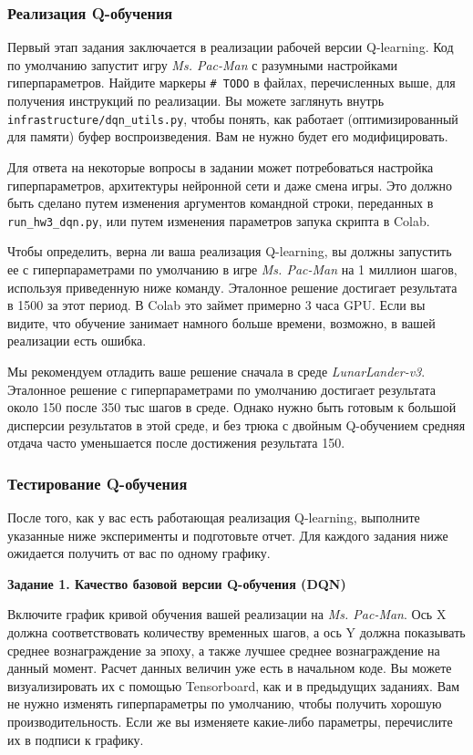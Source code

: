 \documentclass[12pt, oneside]{article}
\begin{document}
\subsubsection{Реализация Q-обучения}

Первый этап задания заключается в реализации рабочей версии Q-learning. Код по умолчанию запустит игру \textit{Ms. Pac-Man} с разумными настройками гиперпараметров. Найдите маркеры \verb|# TODO| в файлах, перечисленных выше, для получения инструкций по реализации. Вы можете заглянуть внутрь \verb|infrastructure/dqn_utils.py|, чтобы понять, как работает (оптимизированный для памяти) буфер воспроизведения. Вам не нужно будет его модифицировать.

Для ответа на некоторые вопросы в задании может потребоваться настройка гиперпараметров, архитектуры нейронной сети и даже смена игры. Это должно быть сделано путем изменения аргументов командной строки, переданных в \verb|run_hw3_dqn.py|, или путем изменения параметров запука скрипта в Colab.

Чтобы определить, верна ли ваша реализация Q-learning, вы должны запустить ее с гиперпараметрами по умолчанию в игре \textit{Ms. Pac-Man} на 1 миллион шагов, используя приведенную ниже команду. Эталонное решение достигает результата в 1500 за этот период. В Colab это займет примерно 3 часа GPU. Если вы видите, что обучение занимает намного больше времени, возможно, в вашей реализации есть ошибка.

Мы рекомендуем отладить ваше решение сначала в среде \textit{LunarLander-v3}. Эталонное решение с гиперпараметрами по умолчанию достигает результата около 150 после 350 тыс шагов в среде. Однако нужно быть готовым к большой дисперсии результатов в этой среде, и без трюка с двойным Q-обучением средняя отдача часто уменьшается после достижения результата 150.

\subsubsection{Тестирование Q-обучения}

После того, как у вас есть работающая реализация Q-learning, выполните указанные ниже эксперименты и подготовьте отчет. Для каждого задания ниже ожидается получить от вас по одному графику.

\textbf{Задание 1. Качество базовой версии Q-обучения (DQN)}

Включите график кривой обучения вашей реализации на \textit{Ms. Pac-Man}. Ось X должна соответствовать количеству временных шагов, а ось Y должна показывать среднее вознаграждение за эпоху, а также лучшее среднее вознаграждение на данный момент. Расчет данных величин уже есть в начальном коде. Вы можете визуализировать их с помощью Tensorboard, как и в предыдущих заданиях. Вам не нужно изменять гиперпараметры по умолчанию, чтобы получить хорошую производительность. Если же вы изменяете какие-либо параметры, перечислите их в подписи к графику.
\end{document}
